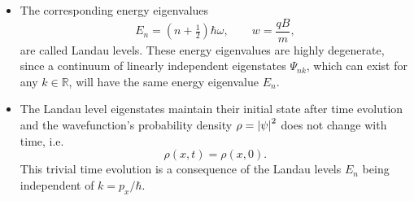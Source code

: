 \documentclass[11pt, a4paper]{article}
\newcommand{\p}{\psi}  %
\renewcommand{\P}{\Psi}  %
\begin{document}
\begin{itemize}
    \item The corresponding energy eigenvalues
	\begin{equation*}
        E_{n} = \left(n + \tfrac{1}{2}\right)\hbar \omega, \qquad w = \frac{qB}{m},
	\end{equation*}
	are called Landau levels. These energy eigenvalues are highly degenerate, since a continuum of linearly independent eigenstates $ \P_{nk} $, which can exist for any $ k \in \mathbb{R} $, will have the same energy eigenvalue $ E_{n} $. 

	\item The Landau level eigenstates maintain their initial state after time evolution and the wavefunction's probability density $ \rho = \abs{\p}^{2} $ does not change with time, i.e.
	\begin{equation*}
		\rho(x, t) = \rho(x, 0).
	\end{equation*}
    This trivial time evolution is a consequence of the Landau levels $ E_{n} $ being independent of $ k = p_{x}/\hbar $.

\end{itemize}
\end{document}
